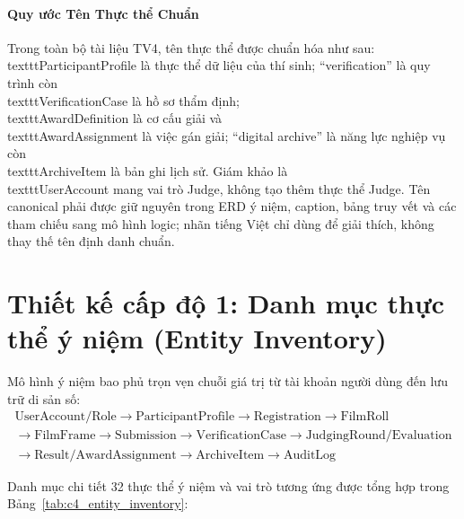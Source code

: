 \paragraph{Quy ước Tên Thực thể Chuẩn}
Trong toàn bộ tài liệu TV4, tên thực thể được chuẩn hóa như sau: \\texttt{ParticipantProfile} là thực thể dữ liệu của thí sinh; ``verification'' là quy trình còn \\texttt{VerificationCase} là hồ sơ thẩm định; \\texttt{AwardDefinition} là cơ cấu giải và \\texttt{AwardAssignment} là việc gán giải; ``digital archive'' là năng lực nghiệp vụ còn \\texttt{ArchiveItem} là bản ghi lịch sử. Giám khảo là \\texttt{UserAccount} mang vai trò Judge, không tạo thêm thực thể Judge.
Tên canonical phải được giữ nguyên trong ERD ý niệm, caption, bảng truy vết và các tham chiếu sang mô hình logic; nhãn tiếng Việt chỉ dùng để giải thích, không thay thế tên định danh chuẩn.

\section{Thiết kế cấp độ 1: Danh mục thực thể ý niệm (Entity Inventory)}
\label{s:c4_conceptual_entities}

Mô hình ý niệm bao phủ trọn vẹn chuỗi giá trị từ tài khoản người dùng đến lưu trữ di sản số:
\begin{equation*}
\begin{split}
\text{UserAccount/Role} \rightarrow \text{ParticipantProfile} \rightarrow \text{Registration} \rightarrow \text{FilmRoll} \\
\rightarrow \text{FilmFrame} \rightarrow \text{Submission} \rightarrow \text{VerificationCase} \rightarrow \text{JudgingRound/Evaluation} \\
\rightarrow \text{Result/AwardAssignment} \rightarrow \text{ArchiveItem} \rightarrow \text{AuditLog}
\end{split}
\end{equation*}

Danh mục chi tiết 32 thực thể ý niệm và vai trò tương ứng được tổng hợp trong Bảng~\ref{tab:c4_entity_inventory}:

